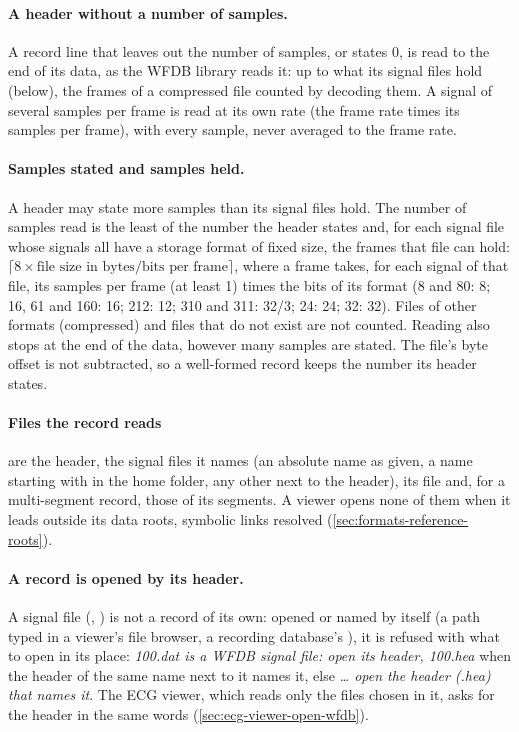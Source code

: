 \paragraph{A header without a number of samples.} A record line that leaves out the number of
samples, or states 0, is read to the end of its data, as the WFDB library reads it: up to what
its signal files hold (below), the frames of a compressed file counted by decoding them. A signal
of several samples per frame is read at its own rate (the frame rate times its samples per
frame), with every sample, never averaged to the frame rate.

\paragraph{Samples stated and samples held.} A header may state more samples than its signal
files hold. The number of samples read is the least of the number the header states and, for
each signal file whose signals all have a storage format of fixed size, the frames that file can
hold: $\lceil 8 \times \text{file size in bytes} / \text{bits per frame} \rceil$, where a frame
takes, for each signal of that file, its samples per frame (at least 1) times the bits of its
format (8 and 80: 8; 16, 61 and 160: 16; 212: 12; 310 and 311: 32/3; 24: 24; 32: 32). Files of
other formats (compressed) and files that do not exist are not counted. Reading also stops at
the end of the data, however many samples are stated. The file's byte offset is not subtracted,
so a well-formed record keeps the number its header states.

\paragraph{Files the record reads} are the header, the signal files it names (an absolute name as
given, a name starting with \code{\textasciitilde} in the home folder, any other next to the
header), its  file and, for a multi-segment record, those of its segments. A viewer
opens none of them when it leads outside its data roots, symbolic links resolved
(\cref{sec:formats-reference-roots}).

\paragraph{A record is opened by its header.} A signal file (, ) is not a
record of its own: opened or named by itself (a path typed in a viewer's file browser, a
recording database's ), it is refused with what to open in its place:
\emph{100.dat is a WFDB signal file: open its header, 100.hea} when the header of the same name
next to it names it, else \emph{\dots{} open the header (.hea) that names it}. The ECG viewer,
which reads only the files chosen in it, asks for the header in the same words
(\cref{sec:ecg-viewer-open-wfdb}).

